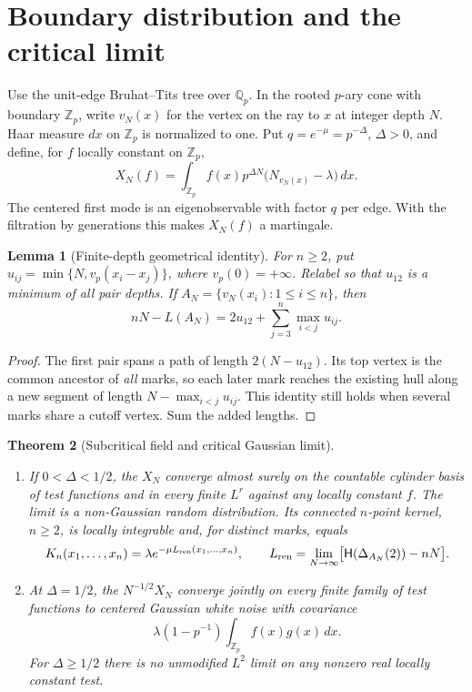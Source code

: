 \documentclass[11pt]{article}
\newtheorem{theorem}{Theorem}[section]
\newtheorem{lemma}[theorem]{Lemma}
\theoremstyle{remark}
\newcommand{\Zp}{\mathbb Z_p}
\newcommand{\Qp}{\mathbb Q_p}
\newcommand{\D}{\Delta}
\newcommand{\hprice}{\mathsf H}
\begin{document}
\section{Boundary distribution and the critical limit}

Use the unit-edge Bruhat--Tits tree over \(\Qp\). In the rooted \(p\)-ary cone with boundary \(\Zp\), write \(v_N(x)\) for the vertex on the ray to \(x\) at integer depth \(N\). Haar measure \(dx\) on \(\Zp\) is normalized to one. Put \(q=e^{-\mu}=p^{-\Delta}\), \(\Delta>0\), and define, for \(f\) locally constant on \(\Zp\),
\begin{equation}\label{eq:mart}
 X_N(f)=\int_{\Zp} f(x)p^{\Delta N}\bigl(N_{v_N(x)}-\lambda\bigr)\,dx .
\end{equation}
The centered first mode is an eigenobservable with factor \(q\) per edge. With the filtration by generations this makes \(X_N(f)\) a martingale.

\begin{lemma}[Finite-depth geometrical identity]\label{lem:bound}
For \(n\ge2\), put \(u_{ij}=\min\{N,v_p(x_i-x_j)\}\), where \(v_p(0)=+\infty\). Relabel so that \(u_{12}\) is a minimum of all pair depths. If \(A_N=\{v_N(x_i):1\le i\le n\}\), then
\begin{equation}\label{eq:bound}
 nN-L(A_N)=2u_{12}+\sum_{j=3}^n\max_{i<j}u_{ij}.
\end{equation}
\end{lemma}
\begin{proof}
The first pair spans a path of length \(2(N-u_{12})\). Its top vertex is the common ancestor of \emph{all} marks, so each later mark reaches the existing hull along a new segment of length \(N-\max_{i<j}u_{ij}\). This identity still holds when several marks share a cutoff vertex. Sum the added lengths.
\end{proof}

\begin{theorem}[Subcritical field and critical Gaussian limit]\label{thm:limits}
\begin{enumerate}
\item If \(0<\Delta<1/2\), the \(X_N\) converge almost surely on the countable cylinder basis of test functions and in every finite \(L^r\) against any locally constant \(f\). The limit is a non-Gaussian random distribution. Its connected \(n\)-point kernel, \(n\ge2\), is locally integrable and, for distinct marks, equals
\begin{equation}\label{eq:ren}
 K_n(x_1,\ldots,x_n)=\lambda e^{-\mu L_{\rm ren}(x_1,\ldots,x_n)},\qquad
 L_{\rm ren}=\lim_{N\to\infty}
       \bigl[\hprice(\D_{A_N}(2))-nN\bigr].
\end{equation}
\item At \(\Delta=1/2\), the \(N^{-1/2}X_N\) converge jointly on every finite family of test functions to centered Gaussian white noise with covariance
\begin{equation}\label{eq:WN}
 \lambda(1-p^{-1})\int_{\Zp} f(x)g(x)\,dx .
\end{equation}
For \(\Delta\ge1/2\) there is no unmodified \(L^2\) limit on any nonzero real locally constant test.
\end{enumerate}
\end{theorem}
\end{document}
